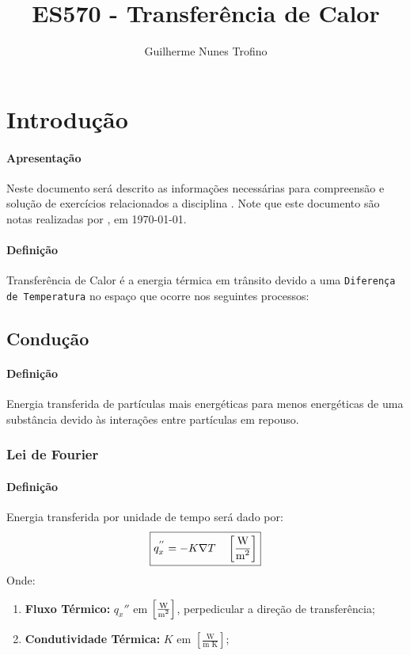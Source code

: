 \documentclass{article}
\title{ES570 - Transferência de Calor}
\author{Guilherme Nunes Trofino}
\begin{document}
    \maketitle
\newpage

    \tableofcontents
\newpage

    \section{Introdução}
        \paragraph{Apresentação}Neste documento será descrito as informações necessárias para compreensão e solução de exercícios relacionados a disciplina \thetitle. Note que este documento são notas realizadas por \theauthor, em \today.

        \paragraph{Definição}Transferência de Calor é a energia térmica em trânsito devido a uma \texttt{Diferença de Temperatura} no espaço que ocorre nos seguintes processos:

        \subsection{Condução}
            \paragraph{Definição}Energia transferida de partículas mais energéticas para menos energéticas de uma substância devido às interações entre partículas em repouso.

        \subsubsection{Lei de Fourier}
            \paragraph{Definição}Energia transferida por unidade de tempo será dado por:
                \begin{equation}
                    \boxed{
                        q_{x}^{''} = - K \nabla T 
                        \quad 
                        \left[\frac{\text{W}}{\text{m\textsuperscript{2}}}\right]
                    }
                \end{equation}
            Onde:
                \begin{enumerate}[noitemsep, rightmargin = \leftmargin]
                    \item \textbf{Fluxo Térmico:} $q_{x}''$ em $\left[\frac{\text{W}}{\text{m\textsuperscript{2}}}\right]$, perpedicular a direção de transferência;

                    \item \textbf{Condutividade Térmica:} $K$ em $\left[\frac{\text{W}}{\text{m K}}\right]$;
                \end{enumerate}
\end{document}
